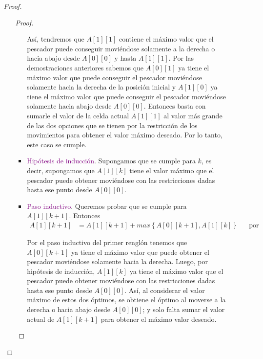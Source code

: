 \documentclass[letterpaper,11pt]{article}
\begin{document}
\begin{enumerate}
\begin{itemize}
\begin{proof}
\begin{itemize}
\begin{proof}
\begin{itemize}
                        Así, tendremos que $A[1][1]$ contiene el máximo valor 
                        que el pescador puede conseguir moviéndose solamente 
                        a la derecha o hacia abajo desde $A[0][0]$ y hasta 
                        $A[1][1]$. Por las demostraciones anteriores sabemos
                        que $A[0][1]$ ya tiene el máximo valor que puede 
                        conseguir el pescador moviéndose solamente hacia la 
                        derecha de la posición inicial y $A[1][0]$ ya tiene 
                        el máximo valor que puede conseguir el pescador 
                        moviéndose solamente hacia abajo desde $A[0][0]$. 
                        Entonces basta con sumarle el valor de la celda actual 
                        $A[1][1]$ al valor más grande de las dos opciones 
                        que se tienen por la restricción de los movimientos 
                        para obtener el valor máximo deseado. Por lo tanto, 
                        este caso se cumple. 

                        \item \textcolor{purple}{Hipótesis de inducción}. 
                        Supongamos que se cumple para $k$, es decir, supongamos
                        que $A[1][k]$ tiene el valor máximo que el pescador 
                        puede obtener moviéndose con las restricciones dadas
                        hasta ese punto desde $A[0][0]$.

                        \item \textcolor{purple}{Paso inductivo}. Queremos 
                        probar que se cumple para $A[1][k+1]$. Entonces 
                        \begin{align*}
                            A[1][k+1] 
                            &= A[1][k+1] + max\left\{A[0][k+1], A[1][k] \right\}
                            && \text{por definición}
                        \end{align*}

                        Por el paso inductivo del primer renglón tenemos que 
                        $A[0][k+1]$ ya tiene el máximo valor que puede obtener el 
                        pescador moviéndose solamente hacia la derecha. Luego, 
                        por hipótesis de inducción, $A[1][k]$ ya tiene el máximo
                        valor que el pescador puede obtener moviéndose con las 
                        restricciones dadas hasta ese punto desde $A[0][0]$. Así, 
                        al considerar el valor máximo de estos dos óptimos, se 
                        obtiene el óptimo al moverse a la derecha o hacia abajo 
                        desde $A[0][0]$; y solo falta sumar el valor actual de 
                        $A[1][k+1]$ para obtener el máximo valor deseado. 
                    \end{itemize}
                \end{proof}


\end{itemize}
\end{proof}
\end{itemize}
\end{enumerate}
\end{document}
